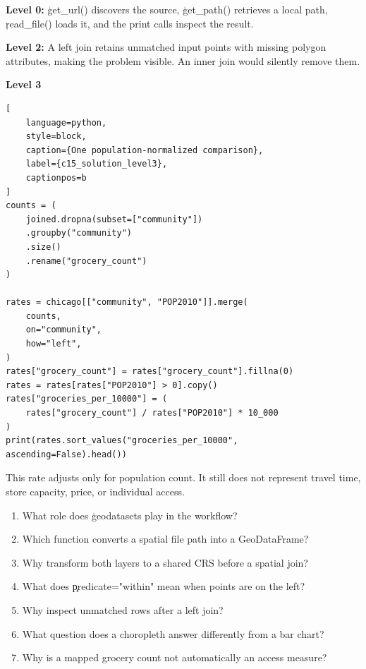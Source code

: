 
\textbf{Level 0:} \c{get_url()} discovers the source, \c{get_path()} retrieves a
local path, \c{read_file()} loads it, and the print calls inspect the result.

\textbf{Level 2:} A left join retains unmatched input points with missing polygon
attributes, making the problem visible. An inner join would silently remove them.

\textbf{Level 3}

\begin{lstlisting}[
    language=python,
    style=block,
    caption={One population-normalized comparison},
    label={c15_solution_level3},
    captionpos=b
]
counts = (
    joined.dropna(subset=["community"])
    .groupby("community")
    .size()
    .rename("grocery_count")
)

rates = chicago[["community", "POP2010"]].merge(
    counts,
    on="community",
    how="left",
)
rates["grocery_count"] = rates["grocery_count"].fillna(0)
rates = rates[rates["POP2010"] > 0].copy()
rates["groceries_per_10000"] = (
    rates["grocery_count"] / rates["POP2010"] * 10_000
)
print(rates.sort_values("groceries_per_10000", ascending=False).head())
\end{lstlisting}

This rate adjusts only for population count. It still does not represent travel
time, store capacity, price, or individual access.


\begin{enumerate}
    \item What role does \c{geodatasets} play in the workflow?
    \item Which function converts a spatial file path into a GeoDataFrame?
    \item Why transform both layers to a shared CRS before a spatial join?
    \item What does \c{predicate="within"} mean when points are on the left?
    \item Why inspect unmatched rows after a left join?
    \item What question does a choropleth answer differently from a bar chart?
    \item Why is a mapped grocery count not automatically an access measure?
\end{enumerate}


